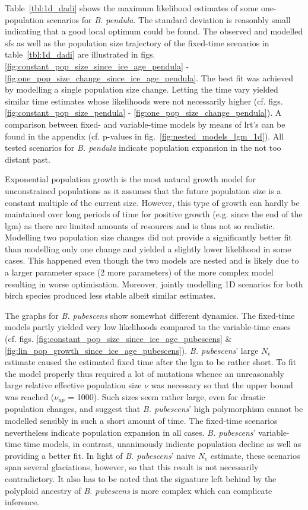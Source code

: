 \documentclass[hidelinks,11pt]{article}
\newcommand{\pendula}{\textit{B. pendula}}
\newcommand{\pubescens}{\textit{B. pubescens}}
\begin{document}
    Table~\ref{tbl:1d_dadi} shows the maximum likelihood estimates of some one-population scenarios for \pendula{}. The standard deviation is reasonbly small indicating that a good local optimum could be found. The observed and modelled \acrshort{sfs} as well as the population size trajectory of the fixed-time scenarios in table~\ref{tbl:1d_dadi} are illustrated in figs. \ref{fig:constant_pop_size_since_ice_age_pendula} - \ref{fig:one_pop_size_change_since_ice_age_pendula}. The best fit was achieved by modelling a single population size change. Letting the time vary yielded similar time estimates whose likelihoods were not necessarily higher (cf. figs. \ref{fig:constant_pop_size_pendula} - \ref{fig:one_pop_size_change_pendula}). A comparison between fixed- and variable-time models by means of \acrshort{lrt}'s can be found in the appendix (cf. p-values in fig.~\ref{fig:nested_models_lgm_1d}). All tested scenarios for \pendula{} indicate population expansion in the not too distant past.

    Exponential population growth is the most natural growth model for unconstrained populations as it assumes that the future population size is a constant multiple of the current size. However, this type of growth can hardly be maintained over long periods of time for positive growth (e.g. since the end of the \acrshort{lgm}) as there are limited amounts of resources and is thus not so realistic. Modelling two population size changes did not provide a significantly better fit than modelling only one change and yielded a slightly lower likelihood in some cases. This happened even though the two models are nested and is likely due to a larger parameter space (2 more parameters) of the more complex model resulting in worse optimisation. Moreover, jointly modelling 1D scenarios for both birch species produced less stable albeit similar estimates.

    The graphs for \pubescens{} show somewhat different dynamics. The fixed-time models partly yielded very low likelihoods compared to the variable-time cases (cf. figs. \ref{fig:constant_pop_size_since_ice_age_pubescens} \& \ref{fig:lin_pop_growth_since_ice_age_pubescens}). \pubescens{}' large $N_e$ estimate caused the estimated fixed time after the \acrshort{lgm} to be rather short. To fit the model properly thus required a lot of mutations whence an unreasonably large relative effective population size $\nu$ was necessary so that the upper bound was reached ($\nu_{up}$ = 1000). Such sizes seem rather large, even for drastic population changes, and suggest that \pubescens{}' high polymorphism cannot be modelled sensibly in such a short amount of time. The fixed-time scenarios nevertheless indicate population expansion in all cases. \pubescens{}' variable-time time models, in contrast, unanimously indicate population decline as well as providing a better fit. In light of \pubescens{}' naive $N_e$ estimate, these scenarios span several glaciations, however, so that this result is not necessarily contradictory. It also has to be noted that the signature left behind by the polyploid ancestry of \pubescens{} is more complex which can complicate inference.
\end{document}
